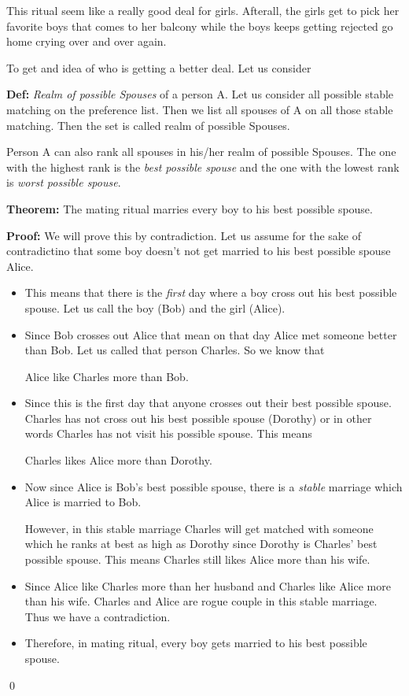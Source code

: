 \documentclass[a4paper, 12pt]{article}
\newcommand{\definition}{\vspace{1em}\noindent\textbf{Def:} }
\newcommand{\theorem}{\vspace{1em}\noindent\textbf{Theorem:} }
\renewcommand{\proof}{\vspace{0.5em}\noindent\textbf{Proof:} }
\newcommand{\qedd}{\qed\newline}
\begin{document}
	This ritual seem like a really good deal for girls. Afterall, the girls get to pick her favorite boys that comes to her balcony while the boys keeps getting rejected go home crying over and over again.
	
	To get and idea of who is getting a better deal. Let us consider 
	
	\definition \emph{Realm of possible Spouses} of a person A. Let us consider all possible stable matching on the preference list. Then we list all spouses of A on all those stable matching. Then the set is called realm of possible Spouses.
	
	Person A can also rank all spouses in his/her realm of possible Spouses. The one with the highest rank is the \emph{best possible spouse} and the one with the lowest rank is \emph{worst possible spouse}.
	
	\theorem The mating ritual marries every boy to his best possible spouse.
	
	\proof We will prove this by contradiction. Let us assume for the sake of contradictino that some boy doesn't not get married to his best possible spouse Alice.
	\begin{itemize}
		\item This means that there is the \emph{first} day where a boy cross out his best possible spouse. Let us call the boy (Bob) and the girl (Alice).
		
		\item Since Bob crosses out Alice that mean on that day Alice met someone better than Bob. Let us called that person Charles. So we know that
		\begin{center}
			Alice like Charles more than Bob.
		\end{center}
		
		\item Since this is the first day that anyone crosses out their best possible spouse. Charles has not cross out his best possible spouse (Dorothy) or in other words Charles has not visit his possible spouse. This means
		\begin{center}
			Charles likes Alice more than Dorothy.
		\end{center}
		
		\item Now since Alice is Bob's best possible spouse, there is a \emph{stable} marriage which Alice is married to Bob.
		
		However, in this stable marriage Charles will get matched with someone which he ranks at best as high as Dorothy since Dorothy is Charles' best possible spouse. This means Charles still likes Alice more than his wife.
		
		\item Since Alice like Charles more than her husband and Charles like Alice more than his wife. Charles and Alice are rogue couple in this stable marriage. Thus we have a contradiction.
		
		\item Therefore, in mating ritual, every boy gets married to his best possible spouse.
	\end{itemize}
	\qedd
\end{document}
